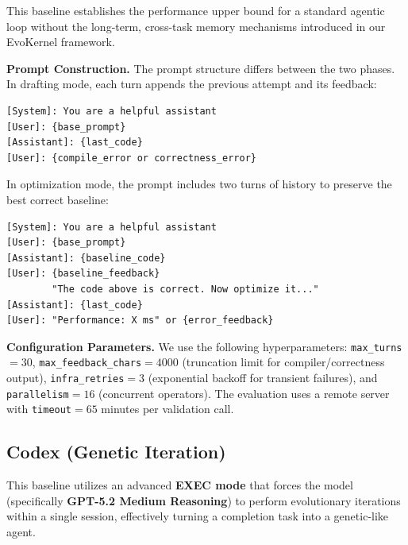 \documentclass{article} %
\theoremstyle{definition}
\theoremstyle{remark}
\begin{document}
  This baseline establishes the performance upper bound for a standard agentic loop without the long-term, cross-task memory mechanisms introduced in our EvoKernel framework.

  \textbf{Prompt Construction.}
  The prompt structure differs between the two phases. In drafting mode, each turn appends the previous attempt and its feedback:
  \begin{tcolorbox}[colback=blue!5, colframe=blue!40, boxrule=0.4pt, arc=2pt, left=2pt, right=2pt, top=2pt, bottom=2pt, title={\small Drafting Mode Prompt}, fonttitle=\bfseries\small]
  \begin{verbatim}
[System]: You are a helpful assistant
[User]: {base_prompt}
[Assistant]: {last_code}
[User]: {compile_error or correctness_error}
  \end{verbatim}
  \end{tcolorbox}
  \noindent In optimization mode, the prompt includes two turns of history to preserve the best correct baseline:
  \begin{tcolorbox}[colback=green!5, colframe=green!40, boxrule=0.4pt, arc=2pt, left=2pt, right=2pt, top=2pt, bottom=2pt, title={\small Optimization Mode Prompt}, fonttitle=\bfseries\small]
  \begin{verbatim}
[System]: You are a helpful assistant
[User]: {base_prompt}
[Assistant]: {baseline_code}
[User]: {baseline_feedback}
        "The code above is correct. Now optimize it..."
[Assistant]: {last_code}
[User]: "Performance: X ms" or {error_feedback}
  \end{verbatim}
  \end{tcolorbox}

  \textbf{Configuration Parameters.}
  We use the following hyperparameters: \texttt{max\_turns}$=30$, \texttt{max\_feedback\_chars}$=4000$ (truncation limit for compiler/correctness output), \texttt{infra\_retries}$=3$ (exponential backoff for transient failures), and \texttt{parallelism}$=16$ (concurrent operators). The evaluation uses a remote server with \texttt{timeout}$=65$ minutes per validation call.

  \subsection{Codex (Genetic Iteration)}
  This baseline utilizes an advanced \textbf{EXEC mode} that forces the model (specifically \textbf{GPT-5.2 Medium Reasoning}) to perform evolutionary iterations within a single session, effectively turning a completion task into a genetic-like agent.
\end{document}

